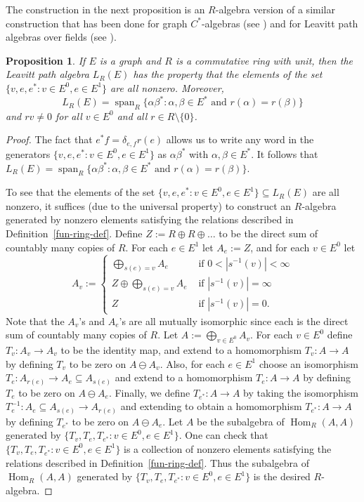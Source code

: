\documentclass[11pt]{amsart}
\newtheorem{proposition}[theorem]{Proposition}
\theoremstyle{remark}
\numberwithin{equation}{section}
\newcommand{\algspan}{\operatorname{span}}
\begin{document}
The construction in the next proposition is an $R$-algebra version of a similar construction that has been done for graph $C^*$-algebras (see \cite[Theorem~1.2]{KPR}) and for Leavitt path algebras over fields (see \cite[Lemma~1.5]{Goo}).

\begin{proposition} \label{LPA-exists}
If $E$ is a graph and $R$ is a commutative ring with unit, then the Leavitt path algebra $L_R(E)$ has the property that the elements of the set $\{ v, e, e^* : v \in E^0, e \in E^1 \}$ are all nonzero.  Moreover, $$L_R(E) = \algspan_R \{ \alpha \beta^* : \alpha, \beta \in E^* \text{ and } r(\alpha) = r(\beta) \}$$ and $r v \neq 0$ for all $v \in E^0$ and all $r \in R \setminus \{ 0 \}$.
\end{proposition}

\begin{proof}
The fact that $e^*f = \delta_{e,f} r(e)$ allows us to write any word in the generators $\{ v, e, e^* : v \in E^0, e \in E^1 \}$ as $\alpha \beta^*$ with $\alpha, \beta \in E^*$.  It follows that $L_R(E) = \algspan_R \{ \alpha \beta^* : \alpha, \beta \in E^* \text{ and } r(\alpha) = r(\beta) \}$.

To see that the elements of the set $\{ v, e, e^* : v \in E^0, e \in E^1 \} \subseteq L_R(E)$ are all nonzero, it suffices (due to the universal property) to construct an $R$-algebra generated by nonzero elements satisfying the relations described in Definition~\ref{fun-ring-def}.  Define $Z :=R \oplus R \oplus \ldots$ to be the direct sum of countably many copies of $R$. For each $e \in E^1$ let $A_e := Z$, and for each $v \in E^0$ let $$A_v := \begin{cases} \displaystyle \bigoplus_{s(e)=v} A_e & \text{ if $0 < |s^{-1}(v) | < \infty$} \\ Z \displaystyle \oplus \bigoplus_{s(e)=v} A_e & \text{ if $|s^{-1}(v) | = \infty$} \\ Z & \text{ if $|s^{-1}(v) | = 0$.} \end{cases}$$  Note that the $A_v$'s and $A_e$'s are all mutually isomorphic since each is the direct sum of countably many copies of $R$.  Let $A := \bigoplus_{v \in E^0} A_v$.  For each $v \in E^0$ define $T_v : A_v \to A_v$ to be the identity map, and extend to a homomorphism $T_v : A \to A$ by defining $T_v$ to be zero on $A \ominus A_v$.  Also, for each $e \in E^1$ choose an isomorphism $T_e : A_{r(e)} \to A_e \subseteq A_{s(e)}$ and extend to a homomorphism $T_e : A \to A$ by defining $T_e$ to be zero on $A \ominus A_e$.  Finally, we define $T_{e^*} : A \to A$ by taking the isomorphism $T_e^{-1} : A_e \subseteq A_{s(e)} \to A_{r(e)}$ and extending to obtain a homomorphism $T_{e^*} : A \to A$ by defining $T_{e^*}$ to be zero on $A \ominus A_e$.  Let $A$ be the subalgebra of $\operatorname{Hom}_R (A, A)$ generated by $\{ T_v, T_e, T_{e^*} : v \in E^0, e \in E^1 \}$. One can check that $\{ T_v, T_e, T_{e^*} : v \in E^0, e \in E^1 \}$ is a collection of nonzero elements satisfying the relations described in Definition~\ref{fun-ring-def}.  Thus the subalgebra of $\operatorname{Hom}_R (A, A)$ generated by $\{ T_v, T_e, T_{e^*} : v \in E^0, e \in E^1 \}$ is the desired $R$-algebra.


\end{proof}
\end{document}
